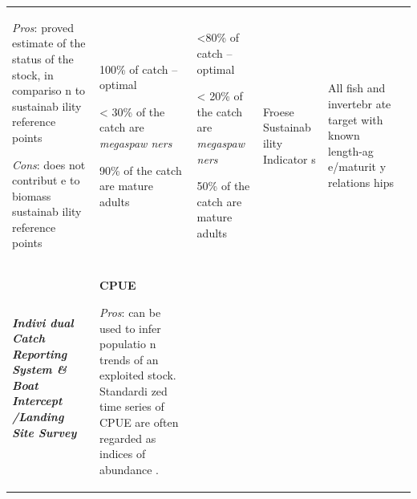 \documentclass[]{book}
\begin{document}
\begin{longtable}[]{@{}llllll@{}}
\begin{minipage}[t]{0.16\columnwidth}
\emph{Pros}: proved estimate of the status of the stock, in compariso n
to sustainab ility reference points

\emph{Cons}: does not contribut e to biomass sustainab ility reference
points\strut
\end{minipage} & \begin{minipage}[t]{0.16\columnwidth}\raggedright\strut
100\% of catch -- optimal

\textless{} 30\% of the catch are \emph{megaspaw ners}

90\% of the catch are mature adults\strut
\end{minipage} & \begin{minipage}[t]{0.16\columnwidth}\raggedright\strut
\textless{}80\% of catch -- optimal

\textless{} 20\% of the catch are \emph{megaspaw ners}

50\% of the catch are mature adults\strut
\end{minipage} & \begin{minipage}[t]{0.16\columnwidth}\raggedright\strut
Froese Sustainab ility Indicator s\strut
\end{minipage} & \begin{minipage}[t]{0.16\columnwidth}\raggedright\strut
All fish and invertebr ate target with known length-ag e/maturit y
relations hips\strut
\end{minipage}\tabularnewline
\begin{minipage}[t]{0.16\columnwidth}\raggedright\strut
\textbf{\emph{Indivi dual Catch Reporting System \& Boat Intercept
/Landing Site Survey}}\strut
\end{minipage} & \begin{minipage}[t]{0.16\columnwidth}\raggedright\strut
\textbf{CPUE}

\emph{Pros}: can be used to infer populatio n trends of an exploited
stock. Standardi zed time series of CPUE are often regarded as indices
of abundance .


\end{minipage}
\end{longtable}
\end{document}
